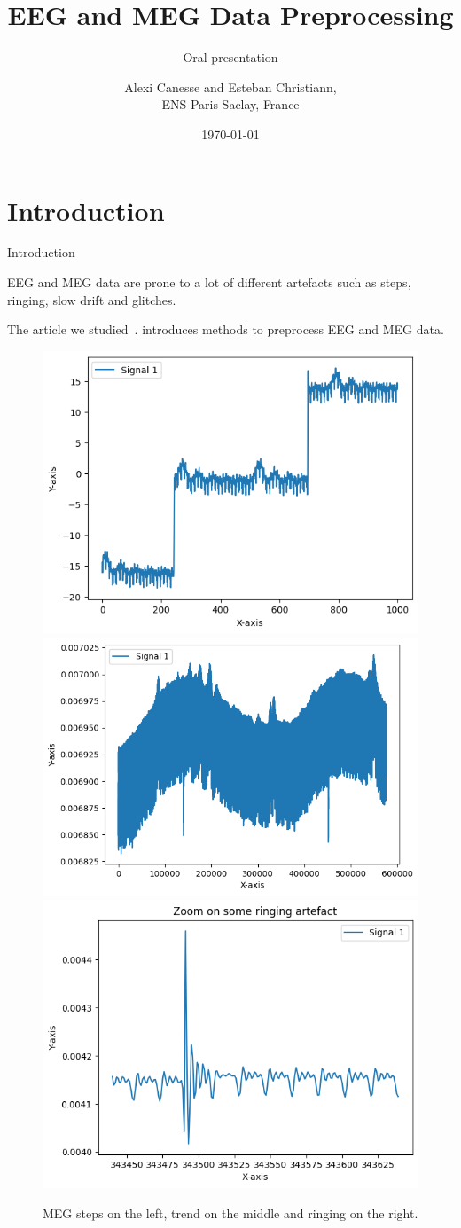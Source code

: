 \documentclass[10pt,serif]{beamer}
\title[] %
{EEG and MEG Data Preprocessing}
\subtitle{Oral presentation}
\author[Esteban Christiann, Alexi Canesse]{{Alexi \sc Canesse} and {Esteban \sc Christiann},\\ ENS Paris-Saclay, France}
\institute[] %
{
    Project for the time series course\\
    Part of the MVA program at ENS Paris-Saclay.\\
}
\date[Oral presentation] %
{\today}
\begin{document}
% 


\begin{frame}
  \titlepage
\end{frame}

\section[\color{white} Introduction]{Introduction}\label{sec:introduction}

\begin{frame}{Introduction}

  EEG and MEG data are prone to a lot of different artefacts such as steps, ringing, slow drift and glitches.

  The article we studied~\cite{DECHEVEIGNE2018}. introduces methods to preprocess EEG and MEG data.

  \begin{figure}
    \centering
    \includegraphics[width=.3\textwidth]{figures/steps_exemple}
    \hfill
    \includegraphics[width=.3\textwidth]{figures/trend_exemple}
    \hfill
    \includegraphics[width=.3\textwidth]{figures/ringing_exemple.png}
    \caption{MEG steps on the left, trend on the middle and ringing on the right.}
\end{figure}

\end{frame}
\end{document}
